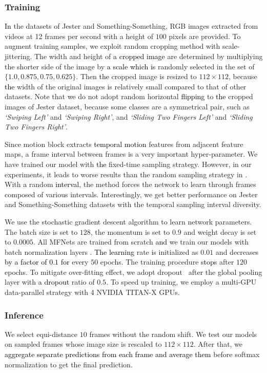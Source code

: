 \documentclass[runningheads]{llncs}
\newcommand{\nj}[1]{\textcolor{black}{#1}}
\begin{document}
\subsubsection{Training}
\nj{In} the datasets of Jester and Something-Something, RGB images extracted from videos at 12 frames per second with a height of $100$ pixels are provided. To augment training samples, we exploit random cropping method with scale-jittering. The width and height of \nj{a cropped image} are determined by multiplying the shorter side of the image by \nj{a scale which is} randomly selected in the set of $\{ 1.0, 0.875, 0.75, 0.625 \}$. Then \nj{the} cropped image is resized to $112\times112$, because \nj{the} width of the original images is relatively small compared to that of other datasets.
Note that we do not adopt random horizontal \nj{flipping} to \nj{the} cropped images of Jester dataset, because some classes are a symmetrical pair, such as \textit{`Swiping Left'} and \textit{`Swiping Right'}, and \textit{`Sliding Two Fingers Left'} and \textit{`Sliding Two Fingers Right'}. 

Since motion block extracts \nj{temporal motion} features from adjacent feature maps, a frame interval between frames is a very important hyper-parameter. We have trained our model with \nj{the} fixed-time sampling strategy. However, in our experiments, it leads to worse results than the random sampling strategy in \cite{wang2016temporal}. With \nj{a} random \nj{interval}, the method forces the network to learn through frames composed of various intervals. Interestingly, we get better performance on Jester and Something-Something datasets with the temporal sampling interval diversity. 

We use the stochastic gradient descent algorithm to learn network parameters. The batch size is set to $128$, the momentum is set to $0.9$ and weight decay is set to $0.0005$. All MFNets are trained from scratch \nj{and} we train our models with batch normalization layers \cite{ioffe2015batch}. \nj{The learning} rate is initialized as $0.01$ and decreases \nj{by a factor of $0.1$ for} every $50$ epochs. The training procedure \nj{stops} after $120$ epochs. To mitigate over-fitting effect, we adopt dropout~\cite{srivastava2014dropout} after the global pooling layer with \nj{a dropout} ratio of $0.5$. To speed up training, we employ a multi-GPU data-parallel strategy with 4 NVIDIA TITAN-X GPUs.

\subsubsection{Inference}
We select equi-distance $10$ frames without the random shift. We test our models on sampled frames whose image size is rescaled to $112\times112$. After that, we \nj{aggregate separate predictions from each frame and average them} before softmax normalization to get the final prediction.  
\end{document}
